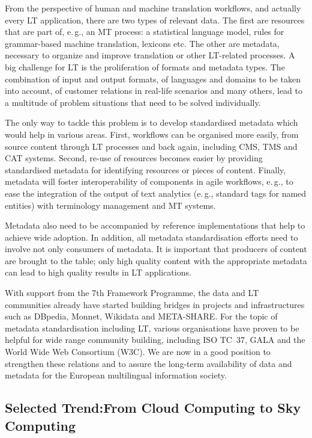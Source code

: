 \documentclass[10pt, plain]{../../metanetpaper}
\begin{document}
\begin{multicols}{2}

From the perspective of human and machine translation workflows, and actually every LT application, there are two types of relevant data. The first are resources that are part of, e.\,g., an MT process: a statistical language model, rules for grammar-based machine translation, lexicons etc. The other are metadata, necessary to organize and improve translation or other LT-related processes. A big challenge for LT is the proliferation of formats and metadata types. The combination of input and output formats, of languages and domains to be taken into account, of customer relations in real-life scenarios and many others, lead to a multitude of problem situations that need to be solved individually.

The only way to tackle this problem is to develop standardised metadata which would help in various areas. First, workflows can be organised more easily, from source content through LT processes and back again, including CMS, TMS and CAT systems. Second, re-use of resources becomes easier by providing standardised metadata for identifying resources or pieces of content. Finally, metadata will foster interoperability of components in agile workflows, e.\,g., to ease the integration of the output of text analytics (e.\,g., standard tags for named entities) with terminology management and MT systems.

Metadata also need to be accompanied by reference implementations that help to achieve wide adoption. In addition, all metadata standardisation efforts need to involve not only consumers of metadata. It is important that producers of content are brought to the table; only high quality content with the appropriate metadata can lead to high quality results in LT applications.

With support from the 7th Framework Programme, the data and LT communities already have started building bridges in projects and infrastructures such as DBpedia, Monnet, Wikidata and META-SHARE. For the topic of metadata standardisation including LT, various organisations have proven to be helpful for wide range community building, including ISO TC~37, GALA and the World Wide Web Consortium (W3C). We are now in a good position to strengthen these relations and to assure the long-term availability of data and metadata for the European multilingual information society.

\subsection[Selected Trend: From Cloud Computing to Sky Computing]{Selected Trend:\newline From Cloud Computing to Sky Computing}
\label{sec:cloud-sky-computing}


\end{multicols}
\end{document}
